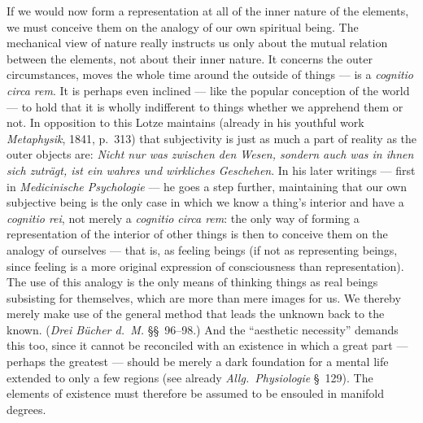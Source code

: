 \documentclass[12pt,a4paper]{book}
\newcommand{\opage}[1]{\marginnote{\footnotesize\textit{[#1]}}}
\begin{document}
If we would now form a representation at all of the inner nature of the elements,
we must conceive them on the analogy of our own spiritual being. The mechanical
view of nature really instructs us only about the mutual relation between the
elements, not about their inner nature. It concerns the outer circumstances,
moves the whole time around the outside of things --- is a \textit{cognitio circa
rem}. It is perhaps even inclined --- like the popular conception of the world
--- to hold that it is wholly indifferent to things whether we apprehend them or
not. In opposition to this Lotze maintains (already in his youthful work
\textit{Metaphysik}, 1841, p.~313) that subjectivity is just as much a part of
reality as the outer objects are: \textit{Nicht nur was zwischen den Wesen,
sondern auch was in ihnen sich zuträgt, ist ein wahres und wirkliches Geschehen}.
In his later writings --- first in \textit{Medicinische Psychologie} --- he goes a
step further, \opage{519}maintaining that our own subjective being is the only case in which
we know a thing's interior and have a \textit{cognitio rei}, not merely a
\textit{cognitio circa rem}: the only way of forming a representation of the
interior of other things is then to conceive them on the analogy of ourselves ---
that is, as feeling beings (if not as representing beings, since feeling is a
more original expression of consciousness than representation). The use of this
analogy is the only means of thinking things as real beings subsisting for
themselves, which are more than mere images for us. We thereby merely make use of
the general method that leads the unknown back to the known. (\textit{Drei Bücher
d.~M.} §§~96--98.) And the ``aesthetic necessity'' demands this too, since it
cannot be reconciled with an existence in which a great part --- perhaps the
greatest --- should be merely a dark foundation for a mental life extended to
only a few regions (see already \textit{Allg.\ Physiologie} §~129). The elements
of existence must therefore be assumed to be ensouled in manifold degrees.
\end{document}
